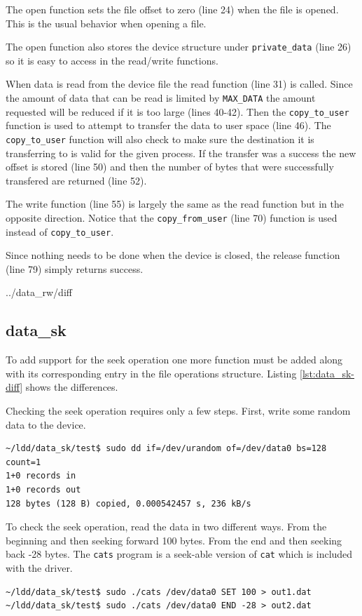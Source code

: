 \documentclass{article}
\begin{document}
The open function sets the file offset to zero (line 24) when the file is
opened.
This is the usual behavior when opening a file.

The open function also stores the device structure under \verb+private_data+
(line 26) so it is easy to access in the read/write functions.

When data is read from the device file the read function (line 31)
is called.
Since the amount of data that can be read is limited by \verb+MAX_DATA+
the amount requested will be reduced if it is too large (lines 40-42).
Then the \verb+copy_to_user+ function is used to attempt to transfer
the data to user space (line 46).
The \verb+copy_to_user+ function will also check to make sure
the destination it is transferring to is valid for the given process.
If the transfer was a success the new offset is stored (line 50)
and then the number of bytes that were successfully transfered are
returned (line 52).

The write function (line 55) is largely the same as the read function
but in the opposite direction.
Notice that the \verb+copy_from_user+ (line 70) function is used
instead of \verb+copy_to_user+.

Since nothing needs to be done when the device is closed,
the release function (line 79) simply returns success.

\pagebreak

	{../data_rw/diff}


\clearpage
\subsection{data\_sk}

To add support for the seek operation one more function must
be added along with its corresponding entry in the
file operations structure.
Listing \ref{lst:data_sk-diff} shows the differences.

Checking the seek operation requires only a few steps.
First, write some random data to the device.
\begin{verbatim}
~/ldd/data_sk/test$ sudo dd if=/dev/urandom of=/dev/data0 bs=128 count=1
1+0 records in
1+0 records out
128 bytes (128 B) copied, 0.000542457 s, 236 kB/s
\end{verbatim}

To check the seek operation, read the data in two different ways.
From the beginning and then seeking forward 100 bytes.
From the end and then seeking back -28 bytes.
The \verb+cats+ program is a seek-able version of \verb+cat+
which is included with the driver.
\begin{verbatim}
~/ldd/data_sk/test$ sudo ./cats /dev/data0 SET 100 > out1.dat
~/ldd/data_sk/test$ sudo ./cats /dev/data0 END -28 > out2.dat
\end{verbatim}
\end{document}
